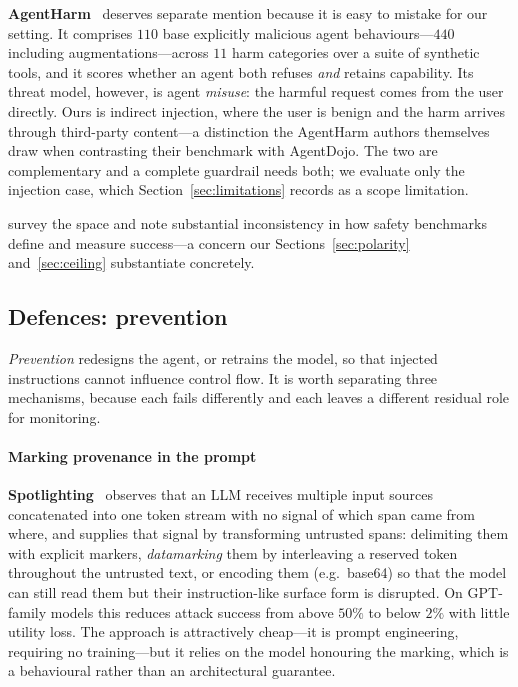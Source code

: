 \documentclass[preprint,12pt,authoryear]{elsarticle}
\theoremstyle{definition}
\begin{document}
\textbf{AgentHarm}~\citep{andriushchenko2025agentharm} deserves separate mention
because it is easy to mistake for our setting. It comprises $110$ base explicitly
malicious agent behaviours---$440$ including augmentations---across $11$ harm categories over
a suite of synthetic tools, and it scores whether an agent both refuses \emph{and}
retains capability. Its threat model, however, is agent \emph{misuse}: the harmful request
comes from the user directly. Ours is indirect injection, where the user is benign
and the harm arrives through third-party content---a distinction the AgentHarm
authors themselves draw when contrasting their benchmark with AgentDojo. The two
are complementary and a complete guardrail needs both; we evaluate only the
injection case, which Section~\ref{sec:limitations} records as a scope
limitation.

\citet{li2026taxonomy} survey the space and note substantial inconsistency in
how safety benchmarks define and measure success---a concern our
Sections~\ref{sec:polarity} and~\ref{sec:ceiling} substantiate concretely.

\subsection{Defences: prevention}

\emph{Prevention} redesigns the agent, or retrains the model, so that injected
instructions cannot influence control flow. It is worth separating three
mechanisms, because each fails differently and each leaves a different residual
role for monitoring.

\paragraph{Marking provenance in the prompt}
\textbf{Spotlighting}~\citep{hines2024spotlighting} observes that an LLM receives
multiple input sources concatenated into one token stream with no signal of which
span came from where, and supplies that signal by transforming untrusted spans:
delimiting them with explicit markers, \emph{datamarking} them by interleaving a
reserved token throughout the untrusted text, or encoding them (e.g.\ base64) so
that the model can still read them but their instruction-like surface form is
disrupted. On GPT-family models this reduces attack success from above $50\%$ to
below $2\%$ with little utility loss. The approach is attractively cheap---it is
prompt engineering, requiring no training---but it relies on the model honouring
the marking, which is a behavioural rather than an architectural guarantee.
\end{document}
